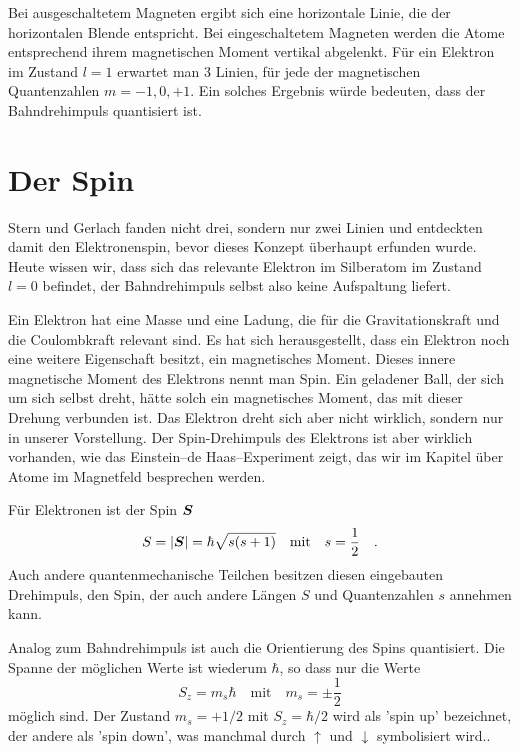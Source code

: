 Bei ausgeschaltetem Magneten ergibt sich eine horizontale Linie, die der horizontalen Blende entspricht. Bei eingeschaltetem Magneten werden die Atome entsprechend ihrem magnetischen Moment vertikal abgelenkt.
 Für ein Elektron im Zustand $l=1$ erwartet man 3 Linien, für jede der  magnetischen Quantenzahlen $m=-1, 0, +1$. Ein solches Ergebnis würde bedeuten, dass der Bahndrehimpuls quantisiert ist.

\section{Der Spin}

Stern und Gerlach fanden nicht drei, sondern nur zwei Linien und entdeckten damit den Elektronenspin, bevor dieses Konzept überhaupt erfunden wurde. Heute wissen wir, dass sich das relevante Elektron im Silberatom im Zustand $l=0$ befindet, der Bahndrehimpuls selbst also keine Aufspaltung liefert. 

Ein Elektron hat eine Masse und eine Ladung, die für die Gravitationskraft und die Coulombkraft relevant sind. Es hat sich herausgestellt, dass ein Elektron noch eine weitere Eigenschaft besitzt, ein magnetisches Moment. Dieses innere magnetische Moment des Elektrons nennt man Spin.  Ein geladener Ball, der sich um sich selbst dreht, hätte solch ein magnetisches Moment, das mit dieser Drehung verbunden ist. Das Elektron dreht sich aber nicht wirklich, sondern nur in
unserer Vorstellung. Der Spin-Drehimpuls des Elektrons ist aber wirklich vorhanden, wie das Einstein--de Haas--Experiment zeigt, das wir im Kapitel über Atome im Magnetfeld besprechen werden.

Für Elektronen ist der Spin $\boldsymbol{S}$ 
\begin{equation}
    S = | \boldsymbol{S} | = \hbar \sqrt{s (s+1)} \quad \text{mit} \quad s = \frac{1}{2} \quad .
\end{equation}
Auch andere quantenmechanische Teilchen besitzen diesen eingebauten Drehimpuls, den Spin, der auch andere Längen $S$ und Quantenzahlen $s$ annehmen kann.

Analog zum Bahndrehimpuls ist auch die Orientierung des Spins quantisiert. Die Spanne der möglichen Werte ist wiederum $\hbar$, so dass nur die Werte 
\begin{equation}
   S_z = m_s \hbar \quad \text{mit} \quad m_s = \pm \frac{1}{2}
\end{equation}
möglich sind. Der Zustand $m_s = + 1/2$ mit $S_z = \hbar /2$ wird als 'spin up' bezeichnet, der andere als 'spin down', was manchmal durch $\uparrow$ und $\downarrow$ symbolisiert wird..

